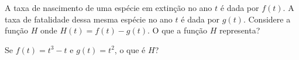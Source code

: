 A taxa de nascimento de uma espécie em extinção no ano $t$ é dada por $f(t)$.
A taxa de fatalidade dessa mesma espécie no ano $t$ é dada por $g(t)$.
Considere a função $H$ onde $H(t)=f(t)-g(t)$.
O que a função $H$ representa? 

Se $f(t)=t^3-t$ e $g(t)=t^2$, o que é $H$?
